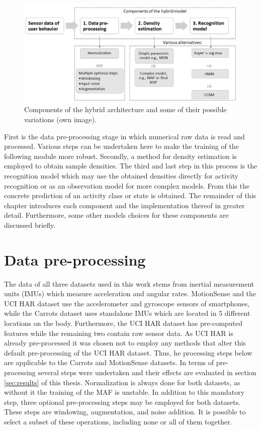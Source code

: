 \documentclass[11pt,titlepage,oneside,openany]{book}
\begin{document}
\begin{figure}[h]
	\centering
	\includegraphics[width=\linewidth]{Hybrid_V2.jpg}
	\caption[Hybrid architecture components]{Components of the hybrid architecture and some of their possible variations (own image).}
	\label{fig:schema}
\end{figure}

\noindent First is the data pre-processing stage in which numerical raw data is read and processed. Various steps can be undertaken here to make the training of the following module more robust. Secondly, a method for density estimation is employed to obtain sample densities. The third and last step in this process is the recognition model which may use the obtained densities directly for activity recognition or as an observation model for more complex models. From this the concrete prediction of an activity class or state is obtained. The remainder of this chapter introduces each component and the implementation thereof in greater detail. Furthermore, some other models choices for these components are discussed briefly.

\section{Data pre-processing}
\label{sec:prep}

The data of all three datasets used in this work stems from inertial measurement units (IMUs) which measure acceleration and angular rates. MotionSense \cite{malekzadeh_mobile_2019} and the UCI HAR \cite{anguita_public_2013} dataset use the accelerometer and gyroscope sensors of smartphones, while the Carrots dataset \cite{kruger_recognising_2011} uses standalone IMUs which are located in 5 different locations on the body. Furthermore, the UCI HAR dataset has pre-computed features while the remaining two contain raw sensor data. As UCI HAR is already pre-processed it was chosen not to employ any methods that alter this default pre-processing of the UCI HAR dataset. Thus, he processing steps below are applicable to the Carrots and MotionSense datasets. In terms of pre-processing several steps were undertaken and their effects are evaluated in section \ref{sec:results} of this thesis. Normalization is always done for both datasets, as without it the training of the MAF is unstable. In addition to this mandatory step, three optional pre-processing steps may be employed for both datasets. These steps are windowing, augmentation, and noise addition. It is possible to select a subset of these operations, including none or all of them together.
\end{document}
